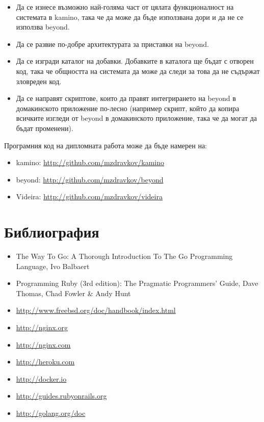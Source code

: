 \documentclass[pdftex,14pt,a4paper]{extreport}
\begin{document}
\begin{itemize}
  \item Да се изнесе възможно най-голяма част от цялата функционалност на системата в kamino, така че да може да бъде използвана дори и да не се използва beyond.
  \item Да се развие по-добре архитектурата за приставки на beyond.
  \item Да се изгради каталог на добавки. Добавките в каталога ще бъдат с отворен код, така че общността на системата да може да следи за това да не съдържат зловреден код.
  \item Да се направят скриптове, които да правят интегрирането на beyond в домакинското приложение по-лесно (например скрипт, който да копира всичките изгледи от beyond в домакинското приложение, така че да могат да бъдат променени).
\end{itemize}
Програмния код на дипломната работа може да бъде намерен на:
\begin{itemize}
  \item kamino: \url{http://github.com/mzdravkov/kamino}
  \item beyond: \url{http://github.com/mzdravkov/beyond}
  \item Videira: \url{http://github.com/mzdravkov/videira}
\end{itemize}

\listoftables
{}
\listoffigures
{}
\chapter*{Библиография}
\begin{itemize}
  \item The Way To Go: A Thorough Introduction To The Go Programming Language, Ivo Balbaert
  \item Programming Ruby (3rd edition): The Pragmatic Programmers' Guide, Dave Thomas, Chad Fowler \& Andy Hunt
  \item \url{http://www.freebsd.org/doc/handbook/index.html}
  \item \url{http://nginx.org}
  \item \url{http://nginx.com}
  \item \url{http://heroku.com}
  \item \url{http://docker.io}
  \item \url{http://guides.rubyonrails.org}
  \item \url{http://golang.org/doc}
\end{itemize}
\end{document}
